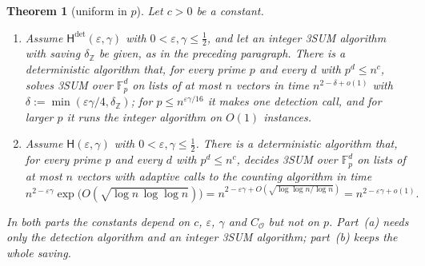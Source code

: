\documentclass[11pt]{article}
\newtheorem{theorem}{Theorem}[section]
\theoremstyle{definition}
\theoremstyle{remark}
\newcommand{\Z}{\mathbb{Z}}
\newcommand{\Fp}{\mathbb{F}_p}
\newcommand{\eps}{\varepsilon}
\newcommand{\Hyp}{\mathsf{H}}
\begin{document}
\begin{theorem}[uniform in $p$]\label{g:thm:App}
Let $c>0$ be a constant.
\begin{enumerate}[label=\textup{(\alph*)}]
\item Assume $\Hyp^{\det}(\eps,\gamma)$ with $0<\eps,\gamma\le\frac12$, and let an integer 3SUM algorithm with saving $\delta_\Z$ be given, as in the preceding paragraph. There is a deterministic algorithm that, for every prime $p$ and every $d$ with $p^d\le n^c$, solves 3SUM over $\Fp^d$ on lists of at most $n$ vectors in time $n^{2-\delta+o(1)}$ with $\delta:=\min(\eps\gamma/4,\delta_\Z)$; for $p\le n^{\eps\gamma/16}$ it makes one detection call, and for larger $p$ it runs the integer algorithm on $O(1)$ instances.
\item Assume $\Hyp(\eps,\gamma)$ with $0<\eps,\gamma\le\frac12$. There is a deterministic algorithm that, for every prime $p$ and every $d$ with $p^d\le n^c$, decides 3SUM over $\Fp^d$ on lists of at most $n$ vectors with adaptive calls to the counting algorithm in time
\[
n^{2-\eps\gamma}\exp\bigl(O(\sqrt{\log n\,\log\log n})\bigr)=n^{2-\eps\gamma+O(\sqrt{\log\log n/\log n})}=n^{2-\eps\gamma+o(1)}.
\]
\end{enumerate}
In both parts the constants depend on $c$, $\eps$, $\gamma$ and $C_{\mathcal O}$ but not on $p$. Part~(a) needs only the detection algorithm and an integer 3SUM algorithm; part~(b) keeps the whole saving.
\end{theorem}
\end{document}
